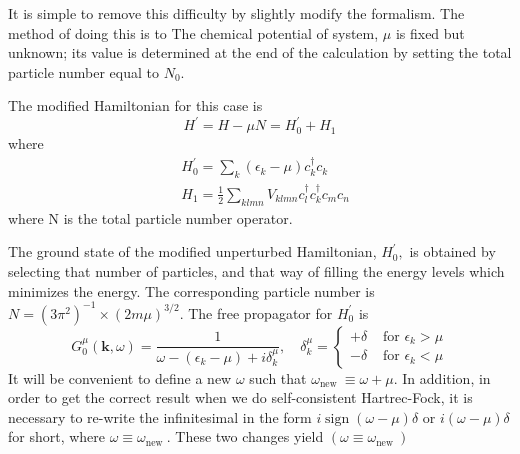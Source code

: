 It is simple to remove this difficulty by slightly modify the formalism. The method of doing this is to  The chemical potential of system, $\mu$ is fixed but unknown; its value is determined at the end of the calculation by setting the total particle number equal to $N_0$.
\begin{imp}
The modified Hamiltonian for this case is
\begin{equation}H^{\prime}=H-\mu N=H_{0}^{\prime}+H_{1}\end{equation}
where
\begin{equation}\begin{aligned}
&H_{0}^{\prime}=\sum_{k}\left(\epsilon_{k}-\mu\right) c_{k}^{\dagger} c_{k}\\
&H_{1}=\frac{1}{2} \sum_{k l m n} V_{k l m n} c_{l}^{\dagger} c_{k}^{\dagger} c_{m} c_{n}
\end{aligned}\end{equation}
where N is the total particle number operator.
\end{imp}
The ground state of the modified unperturbed Hamiltonian, $H^{\prime}_{0},$ is obtained by selecting that number of particles, and that way of filling the energy levels which minimizes the energy. \textbf{} The corresponding particle number is $N=\left(3 \pi^{2}\right)^{-1} \times(2 m \mu)^{3/2} .$ The free propagator for $H_{0}^{\prime}$ is
\begin{equation}G_{0}^{\mu}(\mathbf{k}, \omega)=\frac{1}{\omega-\left(\epsilon_{k}-\mu\right)+i \delta_{k}^{\mu}}, \quad \delta_{k}^{\mu}=\left\{\begin{array}{ll}
+\delta & \text { for } \epsilon_{k}>\mu \\
-\delta & \text { for } \epsilon_{k}<\mu
\end{array}\right.\end{equation}
It will be convenient to define a new $\omega$ such that $\omega_{\text {new }} \equiv \omega+\mu .$ In addition, in order to get the correct result when we do self-consistent Hartrec-Fock, it is necessary to re-write the infinitesimal in the form $i \operatorname{sign}(\omega-\mu) \delta$ or $i(\omega-\mu) \delta$ for short, where $\omega \equiv \omega_{\text {new }} .$ These two changes yield $\left(\omega \equiv \omega_{\text {new }}\right)$
